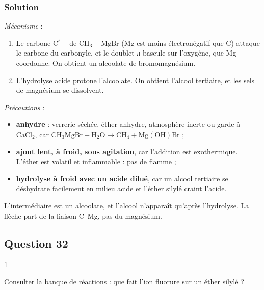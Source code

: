 \documentclass[11pt,a4paper]{article}
\providecommand{\tightlist}{\setlength{\itemsep}{0pt}\setlength{\parskip}{0pt}}
\begin{document}
\hypertarget{solution-30}{%
\subsubsection{Solution}\label{solution-30}}

\emph{Mécanisme} :

\begin{enumerate}
\def\labelenumi{\arabic{enumi}.}
\tightlist
\item
  Le carbone \(\mathrm{C^{\delta-}}\) de \(\mathrm{CH_3{-}MgBr}\) (Mg est moins électronégatif que C) attaque le carbone du carbonyle, et le doublet π bascule sur l'oxygène, que Mg coordonne. On obtient un alcoolate de bromomagnésium.
\item
  L'hydrolyse acide protone l'alcoolate. On obtient l'alcool tertiaire, et les sels de magnésium se dissolvent.
\end{enumerate}

\emph{Précautions} :

\begin{itemize}
\tightlist
\item
  \textbf{anhydre} : verrerie séchée, éther anhydre, atmosphère inerte ou garde à \(\mathrm{CaCl_2}\), car \(\mathrm{CH_3MgBr}+\mathrm{H_2O}\to\mathrm{CH_4}+\mathrm{Mg(OH)Br}\) ;
\item
  \textbf{ajout lent, à froid, sous agitation}, car l'addition est exothermique. L'éther est volatil et inflammable : pas de flamme ;
\item
  \textbf{hydrolyse à froid avec un acide dilué}, car un alcool tertiaire se déshydrate facilement en milieu acide et l'éther silylé craint l'acide.
\end{itemize}

\begin{piege}

L'intermédiaire est un alcoolate, et l'alcool n'apparaît qu'après l'hydrolyse. La flèche part de la liaison C--Mg, pas du magnésium.

\end{piege}

\hypertarget{question-32}{%
\subsection{Question 32}\label{question-32}}

\begin{indication}{1}

Consulter la banque de réactions : que fait l'ion fluorure sur un éther silylé ?

\end{indication}
\end{document}
